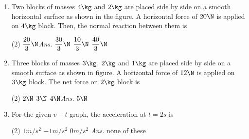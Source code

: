 \documentclass{article}
\newcommand{\ans}{\textcolor{red!95}{\textit{\quad Ans.}}}
\begin{document}
\begin{enumerate}
\item Two blocks of masses $4 \kg$ and $2 \kg$ are placed side by side on a smooth horizontal surface as shown in the figure. A horizontal force of $20 \N$ is applied on $4 \kg$ block. Then, the normal reaction between them is
\begin{center}
\end{center} 
\begin{tasks}(2)
	\task $\dfrac{20}{3}\N$\ans
	\task $\dfrac{30}{3}\N$
	\task $\dfrac{10}{3}\N$
	\task $\dfrac{40}{3}\N$
\end{tasks}

\item Three blocks of masses $3 \kg$, $2 \kg$ and $1 \kg$ are placed side by side on a smooth surface as shown in figure. A horizontal force of $12 \N$ is applied on $3 \kg$ block. The net force on $2 \kg$ block is
\begin{center}
\end{center} 
\begin{tasks}(2)
	\task $2\N$
	\task $3\N$
	\task $4\N$\ans
	\task $5\N$
\end{tasks}

\item For the given $v-t$ graph, the acceleration at $t=2s$ is
    \begin{center}
    \end{center}
    \begin{tasks}(2)
            \task $1 m/s^2$
            \task $-1 m/s^2$
            \task $0 m/s^2$ \ans
            \task none of these
    \end{tasks}


\end{enumerate}
\end{document}
